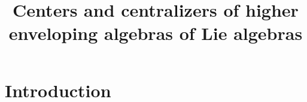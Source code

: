 \documentclass[11pt]{amsart}
\numberwithin{equation}{section}
\begin{document}
\title{Centers and centralizers of higher enveloping algebras of Lie algebras}

%


\maketitle
\thispagestyle{empty}




\tableofcontents

\section{Introduction}
 
\end{document}
